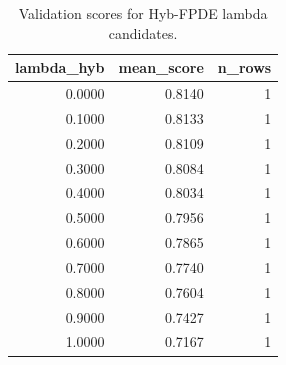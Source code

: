 \begin{table}[t]
\caption{Validation scores for Hyb-FPDE lambda candidates.}
\label{tab:lambda_distribution_computed}
\centering
\begin{tabular}{rrr}
\toprule
lambda\_hyb & mean\_score & n\_rows \\
\midrule
0.0000 & 0.8140 & 1 \\
0.1000 & 0.8133 & 1 \\
0.2000 & 0.8109 & 1 \\
0.3000 & 0.8084 & 1 \\
0.4000 & 0.8034 & 1 \\
0.5000 & 0.7956 & 1 \\
0.6000 & 0.7865 & 1 \\
0.7000 & 0.7740 & 1 \\
0.8000 & 0.7604 & 1 \\
0.9000 & 0.7427 & 1 \\
1.0000 & 0.7167 & 1 \\
\bottomrule
\end{tabular}

\end{table}
